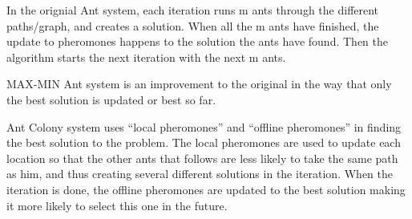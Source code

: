 In the orignial Ant system, each iteration runs m ants through the different paths/graph, and creates a solution. When all the m ants have finished, the update to pheromones happens to the solution the ants have found. Then the algorithm starts the next iteration with the next m ants.

MAX-MIN Ant system is an improvement to the original in the way that only the best solution is updated or best so far.

Ant Colony system uses “local pheromones” and “offline pheromones” in finding the best solution to the problem. The local pheromones are used to update each location so that the other ants that follows are less likely to take the same path as him, and thus creating several different solutions in the iteration. When the iteration is done, the offline pheromones are updated to the best solution making it more likely to select this one in the future.

